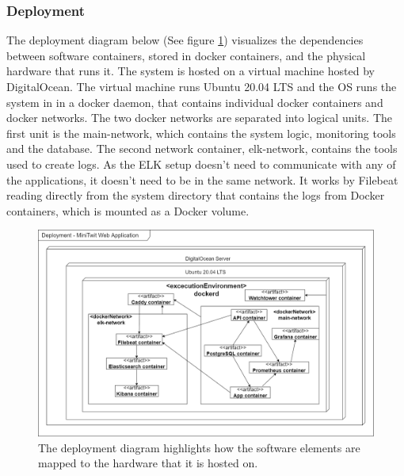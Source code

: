 \subsubsection{Deployment}
The deployment diagram below (See figure \ref{fig:deployment_diagram}) visualizes the dependencies between software containers, stored in docker containers, and the physical hardware that runs it. The system is hosted on a virtual machine hosted by DigitalOcean. The virtual machine runs Ubuntu 20.04 LTS and the OS runs the system in in a docker daemon, that contains individual docker containers and docker 
networks. 
\newline
The two docker networks are separated into logical units. The first unit is the main-network, which contains the system logic, monitoring tools and the database. The second network container, elk-network, contains the tools used to create logs. As the ELK setup doesn't need to communicate with any of the applications, it doesn't need to be in the same network. It works by Filebeat reading directly from the system directory that contains the logs from Docker containers, which is mounted as a Docker volume.


\begin{figure}[H]
    \centering
    \includegraphics[scale=0.37]{images/deployment_diagram.png}
    \caption{The deployment diagram highlights how the software elements are mapped to the hardware that it is hosted on.}
    \label{fig:deployment_diagram}
\end{figure}



